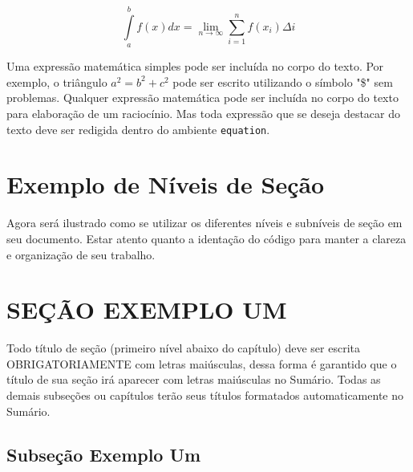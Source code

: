 \documentclass[
  12pt,		%
  a4paper,	%
  openright,%
  oneside,	%
  chapter=TITLE,		%
  section=TITLE,		%
  english,	%
  french,	%
  spanish,	%
  brazil
]{abntex2}
\begin{document}
        \begin{equation}
            \label{eq:integral}
            \int\limits_a^b f(x) dx = \lim_{n \to \infty} \displaystyle\sum_{i=1}^{n} f(x_i) \Delta i
        \end{equation}
        
        
        Uma expressão matemática simples pode ser incluída no corpo do texto. Por exemplo, o triângulo $a^2 = b^2 + c^2$ pode ser escrito utilizando o símbolo "\$" sem problemas. Qualquer expressão matemática pode ser incluída no corpo do texto para elaboração de um raciocínio. Mas toda expressão que se deseja destacar do texto deve ser redigida dentro do ambiente \verb|equation|.
    
        \section{Exemplo de Níveis de Seção}
    
        Agora será ilustrado como se utilizar os diferentes níveis e subníveis de seção em seu documento. Estar atento quanto a identação do código para manter a clareza e organização de seu trabalho.
        
            \section{SEÇÃO EXEMPLO UM}
            Todo título de seção (primeiro nível abaixo do capítulo) deve ser escrita OBRIGATORIAMENTE com letras maiúsculas, dessa forma é garantido que o título de sua seção irá aparecer com letras maiúsculas no Sumário. Todas as demais subseções ou capítulos terão seus títulos formatados automaticamente no Sumário.
            
            
                \subsection{Subseção Exemplo Um}
                \lipsum[8]
                
\end{document}
